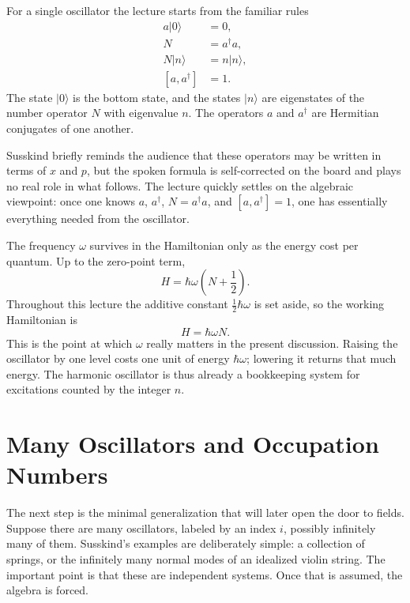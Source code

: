 For a single oscillator the lecture starts from the familiar rules
\begin{align}
a|0\rangle &= 0, \\
N &= a^\dagger a, \\
N|n\rangle &= n|n\rangle, \\
[a,a^\dagger] &= 1.
\end{align}
The state \(|0\rangle\) is the bottom state, and the states \(|n\rangle\) are eigenstates of the number operator \(N\) with eigenvalue \(n\). The operators \(a\) and \(a^\dagger\) are Hermitian conjugates of one another.

Susskind briefly reminds the audience that these operators may be written in terms of \(x\) and \(p\), but the spoken formula is self-corrected on the board and plays no real role in what follows. The lecture quickly settles on the algebraic viewpoint: once one knows \(a\), \(a^\dagger\), \(N=a^\dagger a\), and \([a,a^\dagger]=1\), one has essentially everything needed from the oscillator.

The frequency \(\omega\) survives in the Hamiltonian only as the energy cost per quantum. Up to the zero-point term,
\begin{equation}
H=\hbar\omega\left(N+\frac12\right).
\end{equation}
Throughout this lecture the additive constant \(\frac12\hbar\omega\) is set aside, so the working Hamiltonian is
\begin{equation}
H=\hbar\omega N.
\end{equation}
This is the point at which \(\omega\) really matters in the present discussion. Raising the oscillator by one level costs one unit of energy \(\hbar\omega\); lowering it returns that much energy. The harmonic oscillator is thus already a bookkeeping system for excitations counted by the integer \(n\).

\section{Many Oscillators and Occupation Numbers}

The next step is the minimal generalization that will later open the door to fields. Suppose there are many oscillators, labeled by an index \(i\), possibly infinitely many of them. Susskind's examples are deliberately simple: a collection of springs, or the infinitely many normal modes of an idealized violin string. The important point is that these are independent systems. Once that is assumed, the algebra is forced.

